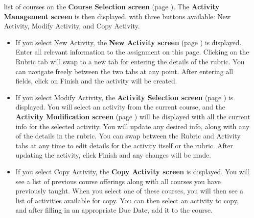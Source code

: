 \documentclass{article}
\begin{document}
\begin{itemize}
\begin{itemize}
	list of courses on the \textbf{Course Selection screen} (page \pageref{courseSel}). The \textbf{Activity 
	  Management screen} is then displayed, with three buttons available: New 
	Activity, Modify Activity, and Copy Activity.
	\begin{itemize}
	\item If you select New Activity, the \textbf{New Activity screen} 
	  (page \pageref{newActivity}) is displayed.
	  Enter all relevant information to the assignment on this page. Clicking on
	  the Rubric tab will swap to a new tab for entering the details of the rubric.
	  You can navigate freely between the two tabs at any point. After entering
	  all fields, click on Finish and the activity will be created.
	\item If you select Modify Activity, the \textbf{Activity Selection screen} (page \pageref{actSel}) is
	  displayed. You will select an activity from the current course, and the
	  \textbf{Activity Modification screen} (page \pageref{newActivity}) 
	  will be displayed with all the current
	  info for the selected activity. You will update any desired info, along with
	  any of the details in the rubric. You can swap between the Rubric and 
	  Activity tabs at any time to edit details for the activity itself or
          the rubric.
	  After updating the activity, click Finish and any changes will be made.
	\item If you select Copy Activity, the \textbf{Copy Activity screen}
          is displayed.
	  You will see a list of previous course offerings along with all courses you
	  have previously taught. When you select one of these courses, you will
	  then see a list of activities available for copy. You can then select an
	  activity to copy, and after filling in an appropriate Due Date, add 
	  it to the course.
	\end{itemize}
    \end{itemize}
\end{itemize}
\end{document}
